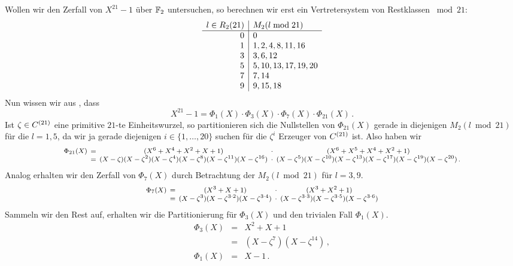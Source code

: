 \begin{beispiel}
  Wollen wir den Zerfall von $X^{21}-1$ über $\mathbb{F}_2$ untersuchen, so berechnen
  wir erst ein Vertretersystem von Restklassen $\bmod{21}$:
  \[\begin{array}[t]{r|l}
    l \in R_2(21) & M_2(l \bmod{21}) \\\hline
    0 & 0 \\
    1 & 1, 2, 4, 8, 11, 16 \\
    3 & 3, 6, 12 \\
    5 & 5, 10, 13, 17, 19, 20 \\
    7 & 7, 14 \\
    9 & 9, 15, 18
  \end{array}\]
  Nun wissen wir aus , dass 
  \[ X^{21} -1 = \Phi_1(X) \cdot \Phi_3(X) \cdot \Phi_7(X) \cdot
  \Phi_{21}(X)\,.\]
  Ist $\zeta \in C^{(21)}$ eine primitive $21$-te Einheitswurzel, so 
  partitionieren sich die Nullstellen von $\Phi_{21}(X)$ gerade in
  diejenigen $M_2(l\bmod{21})$ für die $l=1,5$, da wir ja gerade diejenigen
  $i\in \{1,\ldots,20\}$ suchen für die $\zeta^i$ Erzeuger von $C^{(21)}$ ist.
  Also haben wir 
  \[\footnotesize\setlength{\arraycolsep}{2pt}\everymath{\displaystyle}
    \begin{array}{rcccc} 
      \Phi_{21}(X) &=& (X^{6} + X^{4} + X^{2} + X + 1) 
        &\cdot& (X^{6} + X^{5} + X^{4} + X^{2} + 1) \\
      &=& (X-\zeta)(X-\zeta^2)(X-\zeta^4)(X-\zeta^8)(X-\zeta^{11})
        (X-\zeta^{16}) &\cdot&
        (X-\zeta^5)(X-\zeta^{10})(X-\zeta^{13})(X-\zeta^{17})
        (X-\zeta^{19})(X-\zeta^{20})\,.
    \end{array}\]
  Analog erhalten wir den Zerfall von $\Phi_7(X)$ durch Betrachtung der
  $M_2(l\bmod{21})$ für $l=3,9$. 
  \[\footnotesize\setlength{\arraycolsep}{2pt}\everymath{\displaystyle}
    \begin{array}{rcccc} 
      \Phi_7(X)&=& (X^{3} + X + 1) &\cdot& (X^{3} + X^{2} + 1) \\
      &=& (X-\zeta^3)(X-\zeta^{3\cdot 2})(X-\zeta^{3\cdot 4}) &\cdot&
        (X-\zeta^{3\cdot 3})(X-\zeta^{3\cdot 5})(X-\zeta^{3\cdot 6}) 
    \end{array}\]
  Sammeln wir den Rest auf, erhalten wir die Partitionierung für
  $\Phi_3(X)$ und den trivialen Fall $\Phi_1(X)$.
  \[ \begin{array}{rcc} 
    \Phi_3(X) &=& X^2 + X + 1\\
              &=& (X-\zeta^7)(X-\zeta^{14})\,,\\[10pt]
    \Phi_1(X) &=& X-1\,.
    \end{array}\]
\end{beispiel}


